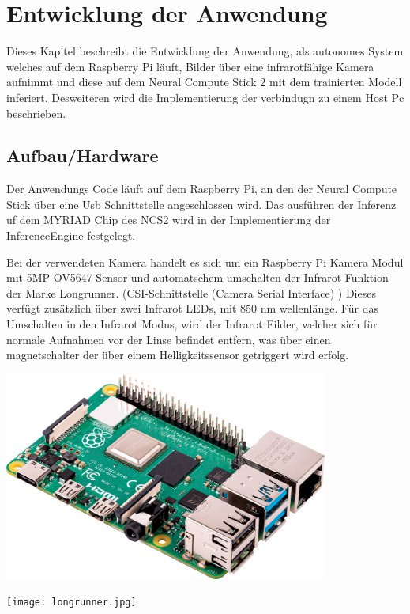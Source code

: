 
\chapter{Entwicklung der Anwendung}\label{kap:application}

Dieses Kapitel beschreibt die Entwicklung der Anwendung, als 
autonomes System welches auf dem Raspberry Pi läuft, 
Bilder über eine infrarotfähige Kamera aufnimmt und diese
auf dem Neural Compute Stick 2 mit dem trainierten Modell 
inferiert.
Desweiteren wird die Implementierung der verbindugn zu einem 
Host Pc beschrieben.


\section{Aufbau/Hardware}\label{sec:aufbau}



Der Anwendungs Code läuft auf dem Raspberry Pi, an den 
der Neural Compute Stick über eine Usb Schnittstelle 
angeschlossen wird.
Das ausführen der Inferenz uf dem MYRIAD Chip des NCS2 
wird in der Implementierung der InferenceEngine festgelegt.

Bei der verwendeten Kamera handelt es sich um ein Raspberry Pi 
Kamera Modul mit 5MP OV5647 Sensor 
und automatschem umschalten der Infrarot Funktion der Marke 
Longrunner. (CSI-Schnittstelle (Camera Serial Interface) )
Dieses verfügt zusätzlich über zwei Infrarot LEDs, mit 850 nm wellenlänge.
Für das Umschalten in den Infrarot Modus, wird der Infrarot Filder, welcher sich 
für normale Aufnahmen vor der Linse befindet entfern, was über einen magnetschalter 
der über einem Helligkeitssensor getriggert wird erfolg.

\begin{minipage}{0.55\textwidth}
    \centering
    \includegraphics[width=0.8\textwidth]{./Bilder/raspberrypi_4.png}
    \label{img:raspberrypi}
\end{minipage}
\begin{minipage}{0.45\textwidth}
    \centering
    \texttt{[image: longrunner.jpg]}
    \label{fig:rpicam}
\end{minipage}
\vspace{0.6cm}


